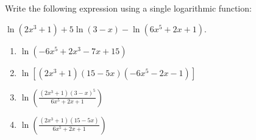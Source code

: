 \bigskip

\item Write the following expression using a single logarithmic function:

$\displaystyle \ln(2x^3+1)+5\ln(3-x)-\ln(6x^5+2x+1)$.

\begin{enumerate}
\item $\displaystyle \ln(-6x^5+2x^3-7x+15)$
\item $\displaystyle \ln[(2x^3+1)(15-5x)(-6x^5-2x-1)]$
\item $\displaystyle \ln\left(\frac{(2x^3+1)(3-x)^5}{6x^5+2x+1}\right)$
\item $\displaystyle \ln\left(\frac{(2x^3+1)(15-5x)}{6x^5+2x+1}\right)$
\end{enumerate}


